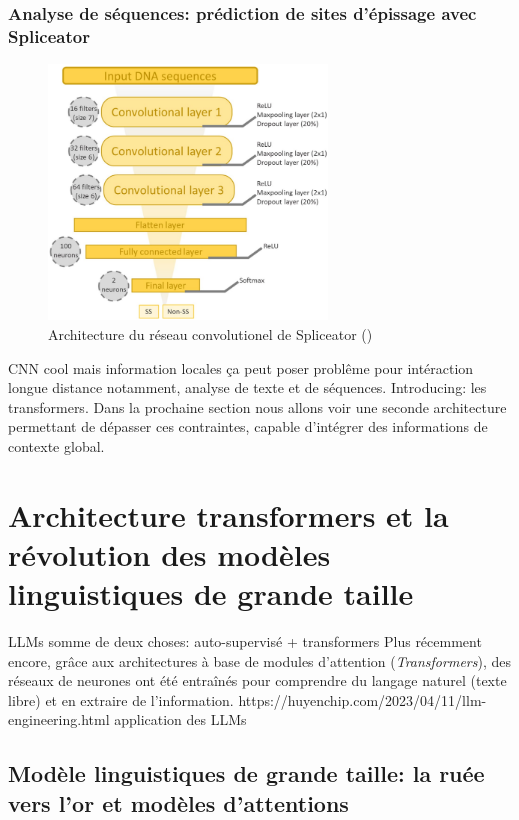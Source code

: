 \subsubsection{Analyse de séquences: prédiction de sites d'épissage avec Spliceator}
\begin{figure}[!htbp]
 \centering
 \includegraphics[width=0.66\textwidth]{figures/spliceator_nn.png}
 \caption[Architecture du réseau convolutionel de Spliceator]{Architecture du réseau convolutionel de Spliceator (\cite{scalzitti_spliceator_2021})}
 \label{fig:splice_archi}
\end{figure}

CNN cool mais information locales ça peut poser problême pour intéraction longue distance notamment, analyse de texte et de séquences. Introducing: les transformers. Dans la prochaine section nous allons voir une seconde architecture permettant de dépasser ces contraintes, capable d'intégrer des informations de contexte global.


\section{Architecture transformers et la révolution des modèles linguistiques de grande taille}
LLMs somme de deux choses: auto-supervisé + transformers 
 Plus récemment encore, grâce aux architectures à base de modules d’attention (\textit{Transformers}), des réseaux de neurones ont été entraînés pour comprendre du langage naturel (texte libre) et en extraire de l’information. 
https://huyenchip.com/2023/04/11/llm-engineering.html application des LLMs
\subsection{Modèle linguistiques de grande taille: la ruée vers l'or et modèles d'attentions}

